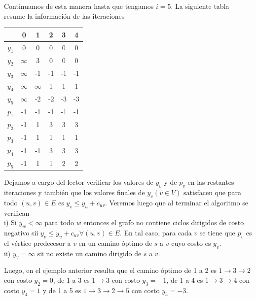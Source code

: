 \documentclass[10pt]{article}
\begin{document}
Continuamos de esta manera hasta que tengamos $i=5$. La siguiente tabla resume la información de las iteraciones

\begin{center}
\begin{tabular}{|c|c|c|c|c|c|}
\hline
 & 0 & 1 & 2 & 3 & 4 \\
\hline
$y_{1}$ & 0 & 0 & 0 & 0 & 0 \\
\hline
$y_{2}$ & $\infty$ & 3 & 0 & 0 & 0 \\
\hline
$y_{3}$ & $\infty$ & -1 & -1 & -1 & -1 \\
\hline
$y_{4}$ & $\infty$ & $\infty$ & 1 & 1 & 1 \\
\hline
$y_{5}$ & $\infty$ & -2 & -2 & -3 & -3 \\
\hline
$p_{1}$ & -1 & -1 & -1 & -1 & -1 \\
\hline
$p_{2}$ & -1 & 1 & 3 & 3 & 3 \\
\hline
$p_{3}$ & -1 & 1 & 1 & 1 & 1 \\
\hline
$p_{4}$ & -1 & -1 & 3 & 3 & 3 \\
\hline
$p_{5}$ & -1 & 1 & 1 & 2 & 2 \\
\hline
\end{tabular}
\end{center}

Dejamos a cargo del lector verificar los valores de $y_{v}$ y de $p_{v}$ en las restantes iteraciones y también que los valores finales de $y_{v}(v \in V)$ satisfacen que para todo $(u, v) \in E$ es $y_{v} \leq y_{u}+c_{u v}$. Veremos luego que al terminar el algoritmo se verifican\\
i) Si $y_{w}<\infty$ para todo $w$ entonces el grafo no contiene ciclos dirigidos de costo negativo sii $y_{v} \leq y_{u}+c_{u v} \forall(u, v) \in E$. En tal caso, para cada $v$ se tiene que $p_{v}$ es el vértice predecesor a $v$ en un camino óptimo de $s$ a $v$ cuyo costo es $y_{v}$.\\
ii) $y_{v}=\infty$ sii no existe un camino dirigido de $s$ a $v$.

Luego, en el ejemplo anterior resulta que el camino óptimo de 1 a 2 es $1 \longrightarrow 3 \longrightarrow 2$ con costo $y_{2}=0$, de 1 a 3 es $1 \longrightarrow 3$ con costo $y_{3}=-1$, de 1 a 4 es $1 \longrightarrow 3 \longrightarrow 4$ con costo $y_{4}=1$ y de 1 a 5 es $1 \longrightarrow 3 \longrightarrow 2 \longrightarrow 5$ con costo $y_{5}=-3$.
\end{document}
